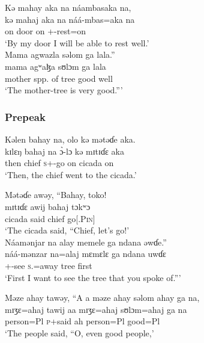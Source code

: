  \medskip
 Kə  mahay  aka  na  náambasaka  na,\\
\gll  kə   mahaj    aka  na   náá-mbas=aka   na\\
 on    door       on      {\PSP}   {\oneS}+{\POT}-rest=on      {\PSP}\\
 \glt ‘By my door I will be able to rest well.’\\

 \medskip
  Mama  agwazla  səlom  ga  lala.”\\
 \gll mama    agʷaɮa       sʊlɔm   ga     lala\\
 mother   {spp. of tree}     good     {\ADJ}   well\\
 \glt ‘The mother-tree is very good.”’
 \z
 
 \subsubsection*{Prepeak}
\ea   Kəlen  bahay  na,  olo  kə  mətəɗe  aka.  \\
\gll  kɪlɛŋ bahaj  na  \`ɔ-lɔ        kə  mɪtɪɗɛ  aka \\
 then    chief  {\PSP}  \textsc{s}+{\PFV}-go    on  cicada  on\\
 \glt ‘Then, the chief went to the cicada.’  
 \z
 
\ea  Mətəɗe  awəy, “Bahay,  toko! \\
\gll mɪtɪɗɛ   awij   bahaj  tɔkʷɔ\\
 cicada  said  chief   {go[{\IMP}.\textsc{Pin}}] \\
 \glt ‘The cicada said, “Chief, let’s go!’  \\
 
 \medskip
 Náamənjar  na  alay  memele  ga  ndana  əwɗe.”\\
 \gll náá{}-mənzar   na=alaj   mɛmɛlɛ ga   ndana  uwɗɛ\\
 {\oneS}+{\POT}-see   \textsc{s}.{\DO}=away   tree   {\ADJ}  {\DEM}   first\\
\glt ‘First I want to see the tree that you spoke of.”’
 \z
 
\ea  Məze  ahay  tawəy,  “A a  məze  ahay  səlom  ahay  ga  na,  \\
 \gll mɪʒɛ=ahaj  tawij   aa mɪʒɛ=ahaj   sʊlɔm=ahaj   ga   na\\
 person=Pl  \textsc{p}+said  ah  person=Pl     good=Pl   {\ADJ}   {\PSP}\\
 \glt ‘The people said, “O, even good people,’\\
 
